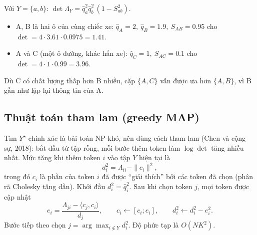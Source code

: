 \documentclass[11pt,a4paper]{article}
\newcommand{\qhat}{\hat{q}}
\begin{document}
\begin{vidu}
Với $Y=\{a,b\}$: $\det\Lambda_Y=\qhat_a^2\qhat_b^2\,(1-S_{ab}^2)$.
\begin{itemize}
\item A, B là hai ô của cùng chiếc xe: $\qhat_A=2,\ \qhat_B=1.9,\ S_{AB}=0.95$ cho $\det=4\cdot3.61\cdot0.0975=1.41$.
\item A và C (một ô đường, khác hẳn xe): $\qhat_C=1,\ S_{AC}=0.1$ cho $\det=4\cdot1\cdot0.99=3.96$.
\end{itemize}
Dù C có chất lượng thấp hơn B nhiều, cặp $\{A,C\}$ vẫn được ưa hơn $\{A,B\}$, vì B gần như lặp lại thông tin của A.

\begin{center}
\end{center}
\end{vidu}

\subsection{Thuật toán tham lam (greedy MAP)}
Tìm $Y^\star$ chính xác là bài toán NP-khó, nên dùng cách tham lam (Chen và cộng sự, 2018): bắt đầu từ tập rỗng, mỗi bước thêm token làm $\log\det$ tăng nhiều nhất. Mức tăng khi thêm token $i$ vào tập $Y$ hiện tại là
\begin{equation}
d_i^2=\Lambda_{ii}-\|c_i\|^2,
\end{equation}
trong đó $c_i$ là phần của token $i$ đã được ``giải thích'' bởi các token đã chọn (phân rã Cholesky tăng dần). Khởi đầu $d_i^2=\qhat_i^2$. Sau khi chọn token $j$, mọi token được cập nhật
\begin{equation}
e_i=\frac{\Lambda_{ji}-\langle c_j,c_i\rangle}{d_j},\qquad c_i\leftarrow[c_i;e_i],\qquad d_i^2\leftarrow d_i^2-e_i^2.
\end{equation}
Bước tiếp theo chọn $j=\arg\max_{i\notin Y}d_i^2$. Độ phức tạp là $O(NK^2)$.
\end{document}
